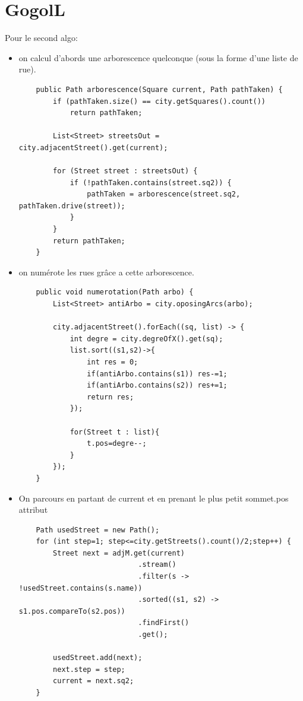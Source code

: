 \documentclass[a4paper, 11pt]{article}
\begin{document}
\section*{GogolL}
Pour le second algo: 

\begin{itemize}
 \item on calcul d'abords une arborescence quelconque (sous la forme d'une liste de rue).
 \begin{verbatim}
    public Path arborescence(Square current, Path pathTaken) {
        if (pathTaken.size() == city.getSquares().count())
            return pathTaken;

        List<Street> streetsOut = city.adjacentStreet().get(current);

        for (Street street : streetsOut) {
            if (!pathTaken.contains(street.sq2)) {
                pathTaken = arborescence(street.sq2, pathTaken.drive(street));
            }
        }
        return pathTaken;
    }
\end{verbatim}

 \item on numérote les rues grâce a cette arborescence.
 \begin{verbatim}
    public void numerotation(Path arbo) {
        List<Street> antiArbo = city.oposingArcs(arbo);
       
        city.adjacentStreet().forEach((sq, list) -> {
            int degre = city.degreOfX().get(sq);
            list.sort((s1,s2)->{
                int res = 0;
                if(antiArbo.contains(s1)) res-=1;
                if(antiArbo.contains(s2)) res+=1;
                return res;
            });
            
            for(Street t : list){
                t.pos=degre--;
            }
        });
    }
\end{verbatim}

 \item On parcours en partant de current et en prenant le plus petit sommet.pos attribut
 \begin{verbatim}
    Path usedStreet = new Path();
    for (int step=1; step<=city.getStreets().count()/2;step++) {
        Street next = adjM.get(current)
                            .stream()
                            .filter(s -> !usedStreet.contains(s.name))
                            .sorted((s1, s2) -> s1.pos.compareTo(s2.pos))
                            .findFirst()
                            .get();
			
        usedStreet.add(next);
        next.step = step;
        current = next.sq2;
    }
\end{verbatim}
\end{itemize}
\end{document}
